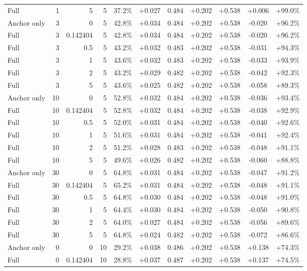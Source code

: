 \begin{table}[htbp]
\begin{tabular}{lrrrccccccc}
Full & 1 & 5 & 5 & 37.2\% & +0.027 & 0.484 & +0.202 & +0.538 & +0.006 & +99.0\% \\
Anchor only & 3 & 0 & 5 & 42.8\% & +0.034 & 0.484 & +0.202 & +0.538 & -0.020 & +96.2\% \\
Full & 3 & 0.142404 & 5 & 42.8\% & +0.034 & 0.484 & +0.202 & +0.538 & -0.020 & +96.2\% \\
Full & 3 & 0.5 & 5 & 43.2\% & +0.032 & 0.483 & +0.202 & +0.538 & -0.031 & +94.3\% \\
Full & 3 & 1 & 5 & 43.6\% & +0.032 & 0.483 & +0.202 & +0.538 & -0.033 & +93.9\% \\
Full & 3 & 2 & 5 & 43.2\% & +0.029 & 0.482 & +0.202 & +0.538 & -0.042 & +92.3\% \\
Full & 3 & 5 & 5 & 43.6\% & +0.025 & 0.482 & +0.202 & +0.538 & -0.058 & +89.3\% \\
Anchor only & 10 & 0 & 5 & 52.8\% & +0.032 & 0.484 & +0.202 & +0.538 & -0.036 & +93.4\% \\
Full & 10 & 0.142404 & 5 & 52.8\% & +0.032 & 0.484 & +0.202 & +0.538 & -0.038 & +92.9\% \\
Full & 10 & 0.5 & 5 & 52.0\% & +0.031 & 0.484 & +0.202 & +0.538 & -0.040 & +92.6\% \\
Full & 10 & 1 & 5 & 51.6\% & +0.031 & 0.484 & +0.202 & +0.538 & -0.041 & +92.4\% \\
Full & 10 & 2 & 5 & 51.2\% & +0.028 & 0.483 & +0.202 & +0.538 & -0.048 & +91.1\% \\
Full & 10 & 5 & 5 & 49.6\% & +0.026 & 0.482 & +0.202 & +0.538 & -0.060 & +88.8\% \\
Anchor only & 30 & 0 & 5 & 64.8\% & +0.031 & 0.484 & +0.202 & +0.538 & -0.047 & +91.2\% \\
Full & 30 & 0.142404 & 5 & 65.2\% & +0.031 & 0.484 & +0.202 & +0.538 & -0.048 & +91.1\% \\
Full & 30 & 0.5 & 5 & 64.8\% & +0.030 & 0.484 & +0.202 & +0.538 & -0.048 & +91.0\% \\
Full & 30 & 1 & 5 & 64.4\% & +0.030 & 0.484 & +0.202 & +0.538 & -0.050 & +90.8\% \\
Full & 30 & 2 & 5 & 64.0\% & +0.027 & 0.484 & +0.202 & +0.538 & -0.056 & +89.6\% \\
Full & 30 & 5 & 5 & 64.8\% & +0.024 & 0.482 & +0.202 & +0.538 & -0.072 & +86.6\% \\
Anchor only & 0 & 0 & 10 & 29.2\% & +0.038 & 0.486 & +0.202 & +0.538 & +0.138 & +74.3\% \\
Full & 0 & 0.142404 & 10 & 28.8\% & +0.037 & 0.487 & +0.202 & +0.538 & +0.137 & +74.5\% \\

\end{tabular}
\end{table}

